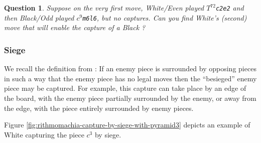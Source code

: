\documentclass[14pt]{extarticle}
\newtheorem{question}{Question}
\begin{document}
\begin{question}
Suppose on the very first move, White/Even played
{\tt $T^{72}$c2e2} and then Black/Odd played {\tt $c^9$m6l6},
but no captures. Can you find White's (second) move that will
enable the capture of a Black \trianglepafill?
\end{question}


\subsubsection{Siege}

We recall the definition from \cite{DG21}:
If an enemy piece is surrounded by opposing pieces in such a way that
the enemy piece has no legal moves then the ``besieged''
enemy piece may be captured. For example, this capture can
take place by an edge of the board, with the enemy piece partially surrounded by the enemy,
or away from the edge, with the piece entirely surrounded by enemy pieces.

Figure \ref{fig:rithmomachia-capture-by-siege-with-pyramid3} depicts an
example of White capturing the piece $c^{3}$ by siege.
\end{document}
